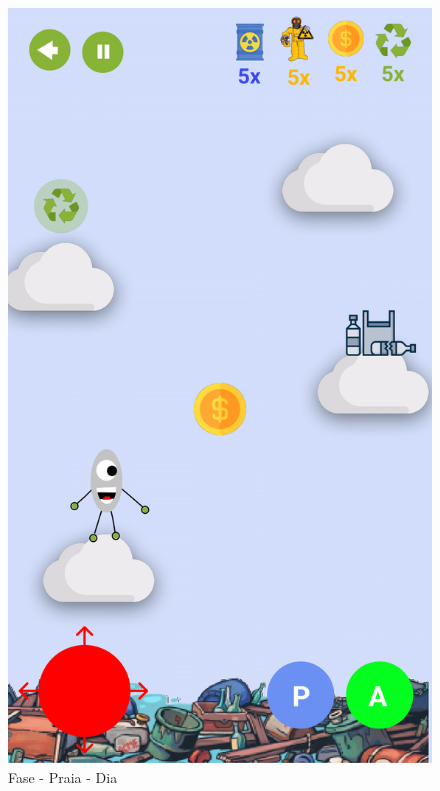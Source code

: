 \documentclass[]{scrartcl}
\begin{document}
\begin{figure}[H]
	\begin{center}
		\includegraphics[scale=0.3]{figs/Game Design-08.png}
		\caption{Fase - Praia - Dia}
	\end{center}
\end{figure}
\end{document}

